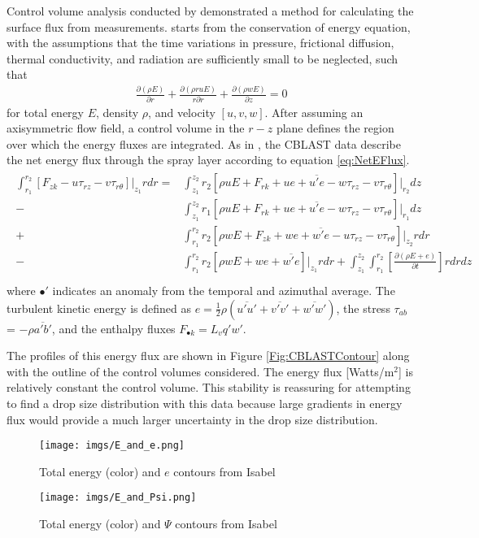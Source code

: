 \documentclass[10pt,a4paper]{article}
\begin{document}
Control volume analysis conducted by \citet{Bell2012} demonstrated a method for calculating the surface flux from measurements. \citet{Bell2012} starts from the conservation of energy equation, with the assumptions that the time variations in pressure, frictional diffusion, thermal conductivity, and radiation are sufficiently small to be neglected, such that
\begin{align}
 \frac{\partial (\rho E)}{\partial r} + \frac{\partial (\rho r u E)}{r \partial r}+ \frac{\partial (\rho w E)}{\partial z}=0
\end{align}
for total energy $E$, density $\rho$, and velocity $[u,v,w]$.
After assuming an axisymmetric flow field, a control volume in the $r-z$ plane defines the region over which the energy fluxes are integrated. As in \citet{Bell2012}, the CBLAST data describe the net energy flux through the spray layer according to equation \ref{eq:NetEFlux}.
\begin{align}
\begin{split}
\int_{r_1}^{r_2} [F_{zk}- u\tau_{rz} - v\tau_{r\theta}]\bigg\rvert_{z_1}rdr =& \int_{z_1}^{z_2} r_2[\rho u E + F_{rk} + ue + \overline{u'e} - w\tau_{rz} - v\tau_{r\theta}]\bigg\rvert_{r_2}dz\\
-& \int_{z_1}^{z_2} r_1[\rho u E + F_{rk} + ue + \overline{u'e} - w\tau_{rz} - v\tau_{r\theta}]\bigg\rvert_{r_1}dz\\
+& \int_{r_1}^{r_2} r_2[\rho w E + F_{zk} + we + \overline{w'e} - u\tau_{rz} - v\tau_{r\theta}]\bigg\rvert_{z_2}rdr\\
-& \int_{r_1}^{r_2} r_2[\rho w E + we + \overline{w'e} ]\bigg\rvert_{z_1}rdr + \int_{z_1}^{z_2}\int_{r_1}^{r_2}\left[\frac{\partial (\rho E + e)}{\partial t}\right]rdrdz\\\label{eq:NetEFlux}
\end{split}
\end{align}
where $\bullet'$ indicates an anomaly from the temporal and azimuthal average. The turbulent kinetic energy is defined as $e = \frac{1}{2}\rho(\overline{u'u'}+\overline{v'v'}+\overline{w'w'})$, the stress $\tau_{ab}$ = $-\rho\overline{a'b'}$, and the enthalpy fluxes $F_{\bullet k} = L_v q' w'$.\par 
The profiles of this energy flux are shown in Figure \ref{Fig:CBLASTContour} along with the outline of the control volumes considered. The energy flux [Watts/m$^2$] is relatively constant the control volume. This stability is reassuring for attempting to find a drop size distribution with this data because large gradients in energy flux would provide a much larger uncertainty in the drop size distribution.
\begin{figure}[h!]
\centering
\texttt{[image: imgs/E\_and\_e.png]}
\caption{Total energy (color) and $e$ contours from Isabel \label{Fig:CBLAST_Ee}}
\end{figure}
\begin{figure}[h!]
\centering
\texttt{[image: imgs/E\_and\_Psi.png]}
\caption{Total energy (color) and $\Psi$ contours from Isabel \label{Fig:CBLAST_EPsi}}
\end{figure}
\end{document}
